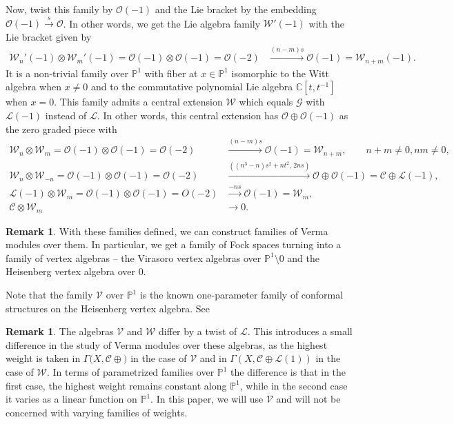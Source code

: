 \documentclass[11pt]{amsart}
\newcommand{\mc}{\mathcal}
\newcommand{\C}{\mathbb{C}}
\newcommand{\PP}{\mathbb{P}}
\numberwithin{equation}{section}
\theoremstyle{plain}
\theoremstyle{definition}
\newtheorem{remark}[theorem]{Remark}
\begin{document}
Now, twist this family by $\mc O(-1)$ and the Lie bracket by the embedding $\mc O(-1)\xrightarrow{s}\mc O$. In other words, we get the Lie algebra family $\mc W'(-1)$ with the Lie bracket given by
\begin{align*}
    \mc W_n'(-1)\otimes \mc W_m'(-1)=\mc O(-1)\otimes \mc O(-1)=\mc O(-2)&\xrightarrow{(n-m)s}\mc O(-1)=\mc W_{n+m}(-1).
\end{align*}
It is a non-trivial family over $\PP^1$ with fiber at $x\in\PP^1$ isomorphic to the Witt algebra when $x\ne 0$ and to the commutative polynomial Lie algebra $\C[t,t^{-1}]$ when $x=0$. This family admits a central extension $\mc W$ which equals $\mc G$ with $\mc L(-1)$ instead of $\mc L$. In other words, this central extension has $\mc O\oplus \mc O(-1)$ as the zero graded piece with
\begin{align*}
    \mc W_n\otimes \mc W_m=\mc O(-1)\otimes \mc O(-1)=\mc O(-2)&\xrightarrow{(n-m)s}\mc O(-1)=\mc W_{n+m},\qquad n+m\ne 0,nm\ne 0,\\
    \mc W_n\otimes \mc W_{-n}=\mc O(-1)\otimes \mc O(-1)=\mc O(-2)&\xrightarrow{((n^3-n)s^2+nt^2,\,2ns)}\mc O\oplus\mc O(-1)=\mc C\oplus\mc L(-1),\\
    \mc L(-1)\otimes \mc W_m=\mc O(-1)\otimes \mc O(-1)=O(-2)&\xrightarrow{-ns}\mc O(-1)=\mc W_m,\\
    \mc C\otimes \mc W_m&\to 0.
\end{align*}

\begin{remark}
    With these families defined, we can construct families of Verma modules over them. In particular, we get a family of Fock spaces turning into a family of vertex algebras -- the Virasoro vertex algebras over $\PP^1\setminus 0$ and the Heisenberg vertex algebra over $0$.

    Note that the family $\mc V$ over $\PP^1$ is the known one-parameter family of conformal structures on the Heisenberg vertex algebra. See \cite[Example 2.5.9]{FBZ04}
\end{remark}

\begin{remark}
    The algebras $\mc V$ and $\mc W$ differ by a twist of $\mc L$. This introduces a small difference in the study of Verma modules over these algebras, as the highest weight is taken in $\Gamma(X,\mc C\oplus\mc)$ in the case of $\mc V$ and in $\Gamma(X,\mc C\oplus\mc L(1))$ in the case of $\mc W$. In terms of parametrized families over $\PP^1$ the difference is that in the first case, the highest weight remains constant along $\PP^1$, while in the second case it varies as a linear function on $\PP^1$. In this paper, we will use $\mc V$ and will not be concerned with varying families of weights.
\end{remark}
\end{document}
